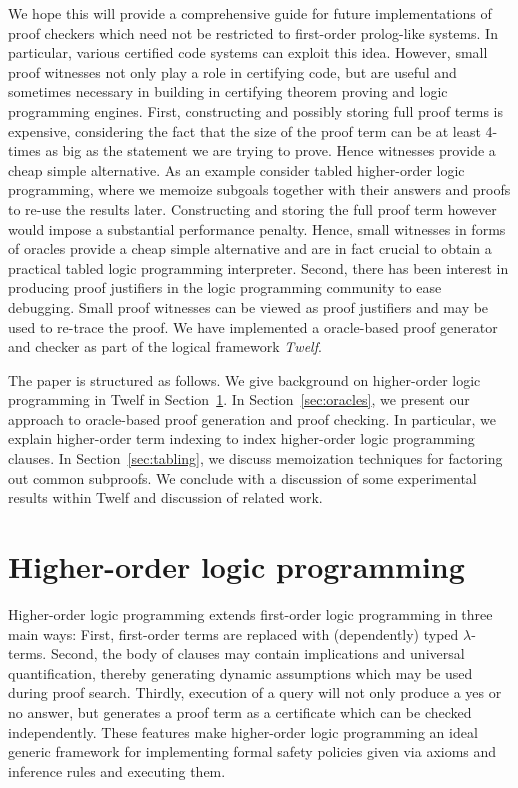 \documentclass{acmconf}
\begin{document}
We hope this will provide a comprehensive guide for future
implementations of proof checkers which need not be restricted to
first-order prolog-like systems. In particular, various
certified code systems can exploit this idea. However, small proof
witnesses not only play a role in certifying code, but are useful and
sometimes necessary in building in certifying theorem proving and
logic programming engines. First, constructing and possibly storing
full proof terms is expensive, considering the fact that the size of
the proof term can be at least 4-times as big as the statement we are
trying to prove. Hence witnesses provide a cheap
simple alternative. As an example consider tabled higher-order logic
programming, where we memoize subgoals together with their answers and
proofs to re-use the results later. Constructing and storing the full
proof term however would impose a substantial performance
penalty. Hence, small witnesses in forms of oracles  provide a cheap
simple alternative and are in fact crucial to obtain a practical
tabled logic programming interpreter. Second, there has been interest
in producing proof justifiers in the logic programming community to
ease debugging. Small proof witnesses can be viewed as proof
justifiers and may be used to re-trace the proof. We have implemented
a oracle-based proof generator and checker as part of the logical
framework {\em Twelf}.  

The paper is structured as follows. We give background on
higher-order logic programming in Twelf in Section~\ref{sec:twelf}. In
Section~\ref{sec:oracles}, we present our approach to oracle-based
proof generation and proof checking. In particular, we explain
higher-order term indexing to index higher-order logic programming
clauses. In Section~\ref{sec:tabling}, we discuss memoization techniques for
factoring out common subproofs. We conclude with a discussion of some
experimental results within Twelf and discussion of related work.

\section{Higher-order logic programming}\label{sec:twelf}

Higher-order logic programming extends first-order logic programming
in three main ways: First, first-order terms are replaced with
(dependently) typed $\lambda$-terms. Second, the body of clauses may
contain implications and universal quantification, thereby generating
dynamic assumptions which may be used during proof search. Thirdly,
execution of a query will not only produce a yes or no answer, but
generates a proof term as a certificate which can be checked
independently. These features make higher-order logic programming an
ideal generic framework for implementing formal safety policies given via
axioms and inference rules and executing them.
\end{document}
